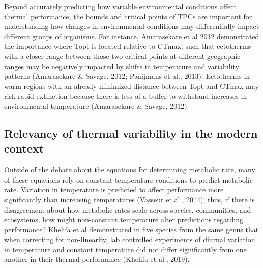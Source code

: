 \documentclass[12pt,twoside]{reedthesis}
\begin{document}
Beyond accurately predicting how variable environmental conditions affect thermal performance, the bounds and critical points of TPCs are important for understanding how changes in environmental conditions may differentially impact different groups of organisms. For instance, Amarasekare et al 2012 demonstrated the importance where Topt is located relative to CTmax, such that ectotherms with a closer range between those two critical points at different geographic ranges may be negatively impacted by shifts in temperature and variability patterns (Amarasekare \& Savage, 2012; Paaijmans et al., 2013). Ectotherms in warm regions with an already minimized distance between Topt and CTmax may risk rapid extinction because there is less of a buffer to withstand increases in environmental temperature (Amarasekare \& Savage, 2012).

\hypertarget{relevancy-of-thermal-variability-in-the-modern-context}{%
\subsection{Relevancy of thermal variability in the modern context}\label{relevancy-of-thermal-variability-in-the-modern-context}}

Outside of the debate about the equations for determining metabolic rate, many of these equations rely on constant temperature conditions to predict metabolic rate. Variation in temperature is predicted to affect performance more significantly than increasing temperatures (Vasseur et al., 2014); thus, if there is disagreement about how metabolic rates scale across species, communities, and ecosystems, how might non-constant temperature alter predictions regarding performance? Khelifa et al demonstrated in five species from the same genus that when correcting for non-linearity, lab controlled experiments of diurnal variation in temperature and constant temperature did not differ significantly from one another in their thermal performance (Khelifa et al., 2019).
\end{document}
